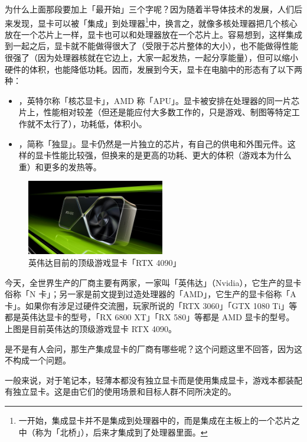 为什么上面那段要加上「最开始」三个字呢？因为随着半导体技术的发展，人们后来发现，显卡可以被「集成」到处理器\footnote{一开始，集成显卡并不是集成到处理器中的，而是集成在主板上的一个芯片之中（称为「北桥」），后来才集成到了处理器里面。}中，换言之，就像多核处理器把几个核心放在一个芯片上一样，显卡也可以和处理器放在一个芯片上。容易想到，这样集成到一起之后，显卡就不能做得很大了（受限于芯片整体的大小），也不能做得性能很强了（因为处理器核就在它边上，大家一起发热，一起分享能量），但可以缩小硬件的体积，也能降低功耗。因而，发展到今天，显卡在电脑中的形态有了以下两种：

\begin{itemize}
  \item {}，英特尔称「核芯显卡」，AMD 称「APU」。显卡被安排在处理器的同一片芯片上，性能相对较差（但还是能应付大多数工作的，只是游戏、制图等特定工作就不太行了），功耗低，体积小。
  \item {}，简称「独显」。显卡仍然是一片独立的芯片，有自己的供电和外围元件。这样的显卡性能比较强，但换来的是更高的功耗、更大的体积（游戏本为什么重）和更多的发热等。
\end{itemize}

\begin{figure}[H]
  \centering
  \includegraphics[width=6cm]{assets/RTX-4090.jpg}
  \caption{英伟达目前的顶级游戏显卡「RTX 4090」}
  \label{4090-gpu}
\end{figure}

今天，全世界生产的厂商主要有两家，一家叫「英伟达」（Nvidia），它生产的显卡俗称「N 卡」；另一家是前文提到过造处理器的「AMD」，它生产的显卡俗称「A 卡」。如果你有涉足过硬件交流圈，玩家所说的「RTX 3060」「GTX 1080 Ti」等都是英伟达显卡的型号，「RX 6800 XT」「RX 580」等都是 AMD 显卡的型号。上图是目前英伟达的顶级游戏显卡 RTX 4090。

\begin{note}
  是不是有人会问，那生产集成显卡的厂商有哪些呢？这个问题这里不回答，因为这不构成一个问题。
\end{note}


一般来说，对于笔记本，轻薄本都没有独立显卡而是使用集成显卡，游戏本都装配有独立显卡。这是由它们的使用场景和目标人群不同所决定的。

